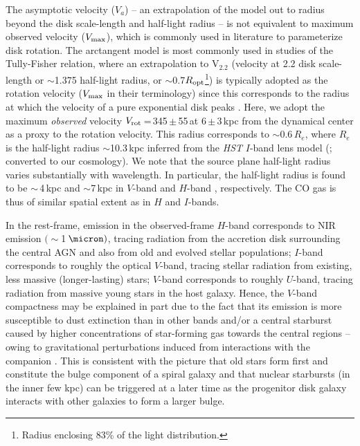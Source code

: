 \documentclass[]{emulateapj}
\begin{document}
The asymptotic velocity ($V_{a}$) -- an extrapolation of the model
out to radius beyond the disk scale-length and half-light radius --
is not equivalent to maximum observed velocity ($V_{\rm max}$),
which is commonly used in literature to parameterize disk rotation.
The arctangent model is most commonly used in studies of the
Tully-Fisher relation, where an extrapolation to V$_{2.2}$ (velocity
at 2.2 disk scale-length or $\sim$1.375 half-light radius,
or $\sim$0.7$R_{\rm opt}$\footnote{Radius enclosing 83\% of the light
distribution.}) is typically adopted
as the rotation velocity ($V_{\rm max}$ in their
terminology) since this corresponds to the radius at which the velocity
of a pure exponential disk peaks \citep{Courteau97b}. %
Here, we adopt the maximum {\em observed} velocity
$V_{\rm rot}$\,=\,345\,$\pm$\,55\,\kms at 6\,$\pm$\,3\,kpc from the %
dynamical center as a proxy to the rotation velocity.
This radius corresponds to $\sim$0.6\,$R_e$, where $R_e$ is the half-light
radius $\sim$10.3\,kpc inferred from the {\it HST} $I$-band
lens model (; converted to
our cosmology).
We note that the source plane half-light radius varies substantially with
wavelength. In particular, the half-light radius is found to be
$\sim$\,4\,kpc and $\sim$7\,kpc in $V$-band
 and $H$-band , respectively.
The CO gas is thus of similar spatial
extent as in $H$ and $I$-bands.

In the rest-frame,
emission in the observed-frame $H$-band corresponds to NIR emission $(\sim$1\,$\micron)$,
tracing radiation from the accretion disk surrounding
the central AGN and also from old and evolved stellar populations;
$I$-band corresponds to roughly the optical $V$-band, tracing stellar radiation from
existing, less massive (\ie longer-lasting) stars;
$V$-band corresponds to roughly $U$-band,  tracing radiation from massive young stars
in the host galaxy. Hence,
the $V$-band compactness may be explained in part
due to the fact that its emission is
more susceptible to dust extinction than in other bands and/or
a central starburst caused by higher
concentrations of star-forming gas towards the central regions -- owing to
gravitational perturbations induced
from interactions with the companion
\citep[\eg][]{DiMatteo05a}.
This is consistent with the picture that old stars form first and constitute the bulge component
of a spiral galaxy and that nuclear starbursts (in the inner few kpc) can be triggered 
at a later time as the progenitor disk galaxy interacts with other galaxies to form a larger bulge.
\end{document}
